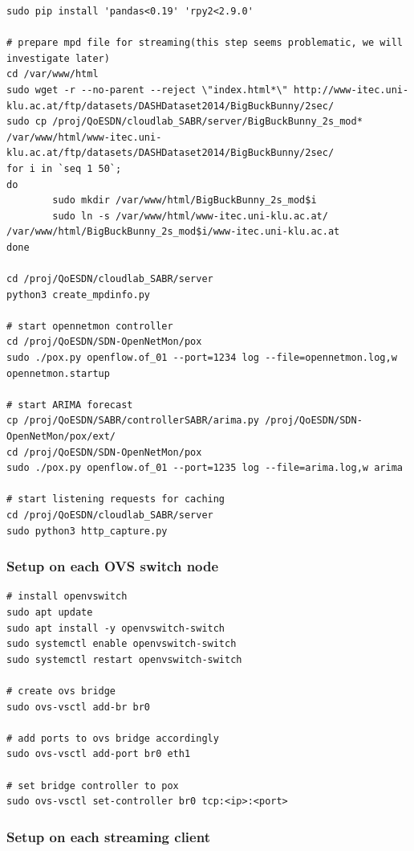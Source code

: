 \documentclass{article}
\begin{document}
\begin{verbatim}
sudo pip install 'pandas<0.19' 'rpy2<2.9.0'

# prepare mpd file for streaming(this step seems problematic, we will investigate later)
cd /var/www/html
sudo wget -r --no-parent --reject \"index.html*\" http://www-itec.uni-klu.ac.at/ftp/datasets/DASHDataset2014/BigBuckBunny/2sec/
sudo cp /proj/QoESDN/cloudlab_SABR/server/BigBuckBunny_2s_mod* /var/www/html/www-itec.uni-klu.ac.at/ftp/datasets/DASHDataset2014/BigBuckBunny/2sec/
for i in `seq 1 50`;
do
        sudo mkdir /var/www/html/BigBuckBunny_2s_mod$i
        sudo ln -s /var/www/html/www-itec.uni-klu.ac.at/ /var/www/html/BigBuckBunny_2s_mod$i/www-itec.uni-klu.ac.at
done

cd /proj/QoESDN/cloudlab_SABR/server
python3 create_mpdinfo.py

# start opennetmon controller
cd /proj/QoESDN/SDN-OpenNetMon/pox
sudo ./pox.py openflow.of_01 --port=1234 log --file=opennetmon.log,w opennetmon.startup

# start ARIMA forecast
cp /proj/QoESDN/SABR/controllerSABR/arima.py /proj/QoESDN/SDN-OpenNetMon/pox/ext/
cd /proj/QoESDN/SDN-OpenNetMon/pox
sudo ./pox.py openflow.of_01 --port=1235 log --file=arima.log,w arima

# start listening requests for caching
cd /proj/QoESDN/cloudlab_SABR/server
sudo python3 http_capture.py

\end{verbatim}

\subsubsection{Setup on each OVS switch node}

\begin{verbatim}
# install openvswitch
sudo apt update
sudo apt install -y openvswitch-switch
sudo systemctl enable openvswitch-switch
sudo systemctl restart openvswitch-switch

# create ovs bridge
sudo ovs-vsctl add-br br0

# add ports to ovs bridge accordingly
sudo ovs-vsctl add-port br0 eth1

# set bridge controller to pox
sudo ovs-vsctl set-controller br0 tcp:<ip>:<port>
\end{verbatim}

\subsubsection{Setup on each streaming client}
\end{document}
